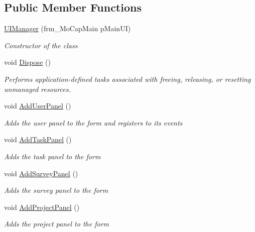 \subsection*{Public Member Functions}
\begin{DoxyCompactItemize}
\item 
\hyperlink{class_plex_byte_1_1_mo_cap_1_1_win_forms_1_1_u_i_manager_ae2c17df837a206d3c8810b357f582ca2}{U\+I\+Manager} (frm\+\_\+\+Mo\+Cap\+Main p\+Main\+UI)
\begin{DoxyCompactList}\small\item\em Constructor of the class \end{DoxyCompactList}\item 
void \hyperlink{class_plex_byte_1_1_mo_cap_1_1_win_forms_1_1_u_i_manager_a052285a490824ae150d9c59430da6aff}{Dispose} ()
\begin{DoxyCompactList}\small\item\em Performs application-\/defined tasks associated with freeing, releasing, or resetting unmanaged resources. \end{DoxyCompactList}\item 
void \hyperlink{class_plex_byte_1_1_mo_cap_1_1_win_forms_1_1_u_i_manager_ad2ff4cf433713d6a788f295b6ea09188}{Add\+User\+Panel} ()
\begin{DoxyCompactList}\small\item\em Adds the user panel to the form and registers to its events \end{DoxyCompactList}\item 
void \hyperlink{class_plex_byte_1_1_mo_cap_1_1_win_forms_1_1_u_i_manager_aba09ffe21c0ce15d23c41056ab4239be}{Add\+Task\+Panel} ()
\begin{DoxyCompactList}\small\item\em Adds the task panel to the form \end{DoxyCompactList}\item 
void \hyperlink{class_plex_byte_1_1_mo_cap_1_1_win_forms_1_1_u_i_manager_aad75458711dee89c6acd1d82ee472bd1}{Add\+Survey\+Panel} ()
\begin{DoxyCompactList}\small\item\em Adds the survey panel to the form \end{DoxyCompactList}\item 
void \hyperlink{class_plex_byte_1_1_mo_cap_1_1_win_forms_1_1_u_i_manager_a4f33e76754bb54fb8123af546a2c59b7}{Add\+Project\+Panel} ()
\begin{DoxyCompactList}\small\item\em Adds the project panel to the form \end{DoxyCompactList}\item 

\end{DoxyCompactItemize}
